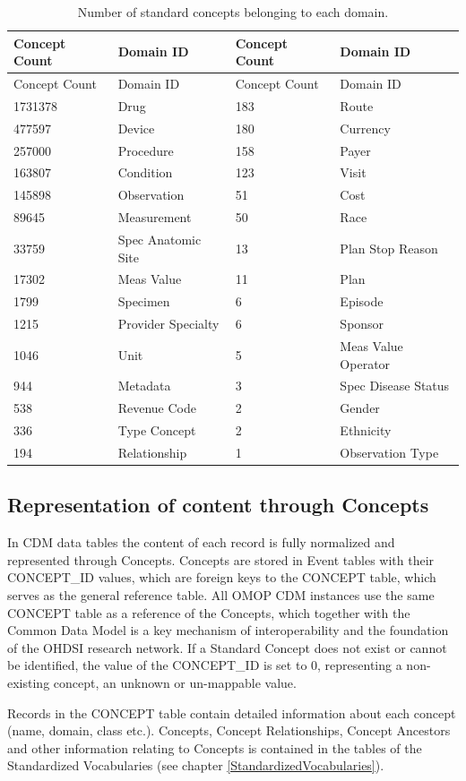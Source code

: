 \documentclass[11pt]{book}
\theoremstyle{definition}
\theoremstyle{definition}
\theoremstyle{definition}
\theoremstyle{remark}
\begin{document}
\begin{longtable}[]{@{}llll@{}}
\caption{\label{tab:domains} Number of standard concepts belonging to each domain.}\tabularnewline
\toprule
Concept Count & Domain ID & Concept Count & Domain ID\tabularnewline
\midrule
\endfirsthead
\toprule
Concept Count & Domain ID & Concept Count & Domain ID\tabularnewline
\midrule
\endhead
1731378 & Drug & 183 & Route\tabularnewline
477597 & Device & 180 & Currency\tabularnewline
257000 & Procedure & 158 & Payer\tabularnewline
163807 & Condition & 123 & Visit\tabularnewline
145898 & Observation & 51 & Cost\tabularnewline
89645 & Measurement & 50 & Race\tabularnewline
33759 & Spec Anatomic Site & 13 & Plan Stop Reason\tabularnewline
17302 & Meas Value & 11 & Plan\tabularnewline
1799 & Specimen & 6 & Episode\tabularnewline
1215 & Provider Specialty & 6 & Sponsor\tabularnewline
1046 & Unit & 5 & Meas Value Operator\tabularnewline
944 & Metadata & 3 & Spec Disease Status\tabularnewline
538 & Revenue Code & 2 & Gender\tabularnewline
336 & Type Concept & 2 & Ethnicity\tabularnewline
194 & Relationship & 1 & Observation Type\tabularnewline
\bottomrule
\end{longtable}

\hypertarget{representation-of-content-through-concepts}{%
\subsection{Representation of content through Concepts}\label{representation-of-content-through-concepts}}

In CDM data tables the content of each record is fully normalized and represented through Concepts. Concepts are stored in Event tables with their CONCEPT\_ID values, which are foreign keys to the CONCEPT table, which serves as the general reference table. All OMOP CDM instances use the same CONCEPT table as a reference of the Concepts, which together with the Common Data Model is a key mechanism of interoperability and the foundation of the OHDSI research network. If a Standard Concept does not exist or cannot be identified, the value of the CONCEPT\_ID is set to 0, representing a non-existing concept, an unknown or un-mappable value.

Records in the CONCEPT table contain detailed information about each concept (name, domain, class etc.). Concepts, Concept Relationships, Concept Ancestors and other information relating to Concepts is contained in the tables of the Standardized Vocabularies (see chapter \ref{StandardizedVocabularies}).
\end{document}
